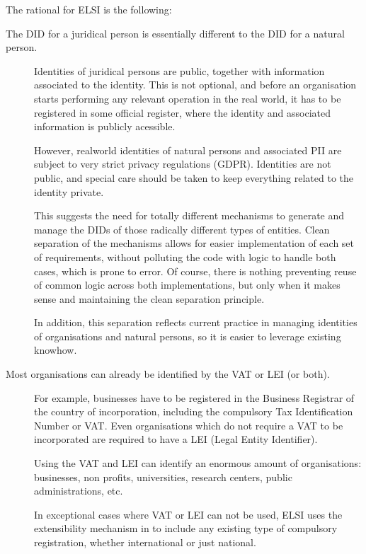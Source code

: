 \documentclass[a4paper,12pt,english]{sphinxhowto}
\begin{document}
\sphinxAtStartPar
The rational for ELSI is the following:
\begin{description}
\item[{The DID for a juridical person is essentially different to the DID for a natural person.}] \leavevmode
\sphinxAtStartPar
Identities of juridical persons are public, together with information associated to the identity. This is not optional, and before an organisation starts performing any relevant operation in the real world, it has to be registered in some official register, where the identity and associated information is publicly acessible.

\sphinxAtStartPar
However, real\sphinxhyphen{}world identities of natural persons and associated PII are subject to very strict privacy regulations (GDPR). Identities are not public, and special care should be taken to keep everything related to the identity private.

\sphinxAtStartPar
This suggests the need for totally different mechanisms to generate and manage the DIDs of those radically different types of entities. Clean separation of the mechanisms allows for easier implementation of each set of requirements, without polluting the code with logic to handle both cases, which is prone to error.
Of course, there is nothing preventing reuse of common logic across both implementations, but only when it makes sense and maintaining the clean separation principle.

\sphinxAtStartPar
In addition, this separation reflects current practice in managing identities of organisations and natural persons, so it is easier to leverage existing know\sphinxhyphen{}how.

\item[{Most organisations can already be identified by the VAT or LEI (or both).}] \leavevmode
\sphinxAtStartPar
For example, businesses have to be registered in the Business Registrar of the country of incorporation, including the compulsory Tax Identification Number or VAT. Even organisations which do not require a VAT to be incorporated are required to have a LEI (Legal Entity Identifier).

\sphinxAtStartPar
Using the VAT and LEI can identify an enormous amount of organisations: businesses, non profits, universities, research centers, public administrations, etc.

\sphinxAtStartPar
In exceptional cases where VAT or LEI can not be used, ELSI uses the extensibility mechanism in  to include any existing type of compulsory registration, whether international or just national.

\end{description}
\end{document}
